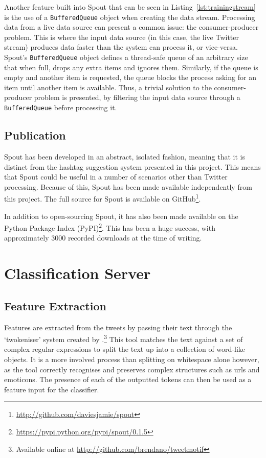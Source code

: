\documentclass[11pt,a4paper]{report}
\begin{document}
Another feature built into Spout that can be seen in Listing~\ref{lst:trainingstream} is the use of a \verb+BufferedQueue+ object when creating the data stream. Processing data from a live data source can present a common issue: the consumer-producer problem. This is where the input data source (in this case, the live Twitter stream) produces data faster than the system can process it, or vice-versa. Spout's \verb+BufferedQueue+ object defines a thread-safe queue of an arbitrary size that when full, drops any extra items and ignores them. Similarly, if the queue is empty and another item is requested, the queue blocks the process asking for an item until another item is available. Thus, a trivial solution to the consumer-producer problem is presented, by filtering the input data source through a \verb+BufferedQueue+ before processing it.

\subsection{Publication}

Spout has been developed in an abstract, isolated fashion, meaning that it is distinct from the hashtag suggestion system presented in this project. This means that Spout could be useful in a number of scenarios other than Twitter processing. Because of this, Spout has been made available independently from this project. The full source for Spout is available on GitHub\footnote{\url{http://github.com/daviesjamie/spout}}.

In addition to open-sourcing Spout, it has also been made available on the Python Package Index (PyPI)\footnote{\url{https://pypi.python.org/pypi/spout/0.1.5}}. This has been a huge success, with approximately 3000 recorded downloads at the time of writing.

\section{Classification Server}

\subsection{Feature Extraction}
Features are extracted from the tweets by passing their text through the `twokeniser' system created by \textcite{OConnor:2010}.\footnote{Available online at \url{http://github.com/brendano/tweetmotif}} This tool matches the text against a set of complex regular expressions to split the text up into a collection of word-like objects. It is a more involved process than splitting on whitespace alone however, as the tool correctly recognises and preserves complex structures such as urls and emoticons. The presence of each of the outputted tokens can then be used as a feature input for the classifier.
\end{document}
